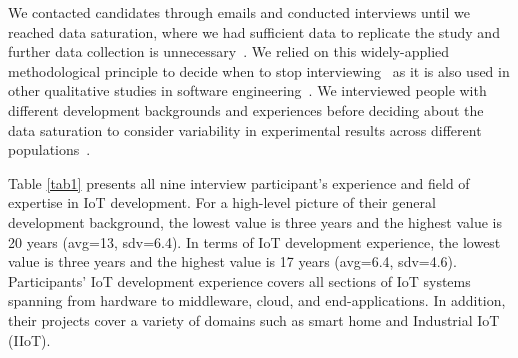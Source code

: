  \begin{table}
\caption{Interview Participants}
\label{tab1}
\end{table}

We contacted candidates through emails and conducted interviews until we reached data saturation, where we had sufficient data to replicate the study and further data collection is unnecessary~\cite{dataSaturationFusch}. We relied on this widely-applied methodological principle to decide when to stop interviewing~\cite{saturationMorse,saturationGuest} as it is also used in other qualitative studies in software engineering~\cite{tweeter2014, aniche2018modern}. We interviewed people with different development backgrounds and experiences before deciding about the data saturation to consider variability in experimental results across different populations~\cite{henrich2010weirdest}. 


 Table \ref{tab1} presents all nine interview participant's experience and field of expertise in IoT development. For a high-level picture of their general development background, the lowest value is three years and the highest value is 20 years (avg=13, sdv=6.4). In terms of IoT development experience, the lowest value is three years and the highest value is 17 years (avg=6.4, sdv=4.6). Participants' IoT development experience covers all sections of IoT systems spanning from hardware to middleware, cloud, and end-applications. In addition, their projects cover a variety of domains such as smart home and Industrial IoT (IIoT). 
 

